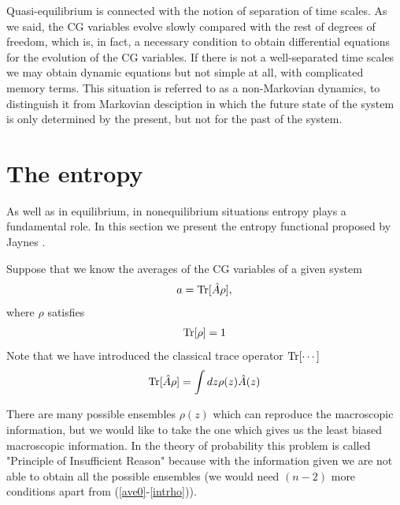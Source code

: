 \documentclass[a4paper,openright,12pt]{book}
\begin{document}
Quasi-equilibrium is connected with the notion of separation of time scales. As we said, the CG variables evolve slowly compared with the rest of degrees of freedom, which is, in fact, a necessary condition to obtain differential equations for the evolution of the CG variables. If there is not a well-separated time scales we may obtain dynamic equations but not simple at all, with complicated memory terms. This situation is referred to as a non-Markovian dynamics, to distinguish it from Markovian desciption in which the future state of the system is only determined by the present, but not for the past of the system. 

\section{The entropy}\label{sec:TheEntropy}
As well as in equilibrium, in nonequilibrium situations entropy plays a fundamental role. In this section we present the entropy functional proposed by Jaynes \cite{Jaynes1957}.

Suppose that we know the averages of the CG variables of a given system 
\begin{align}
    a = {\rm Tr}[{\hat{A}}\rho] ,
    \label{ave0}
\end{align}
where $\rho$ satisfies
\begin{align}
    {\rm Tr}[\rho] = 1
    \label{intrho}
\end{align}
Note that we have introduced the classical trace operator ${\rm Tr}[\cdots]$
\begin{align}
    {\rm Tr}[\hat{A}\rho] = \int dz\rho(z)\hat{A}(z) 
\end{align}

There are many possible ensembles $\rho(z)$ which can reproduce the macroscopic information, but we would like to take the one which gives us the least biased macroscopic information.
In the theory of probability this problem is called "Principle of Insufficient Reason" because with the information given we are not able to obtain all the possible ensembles (we would need $(n-2)$ more conditions apart from (\ref{ave0}-\ref{intrho})).
\end{document}
